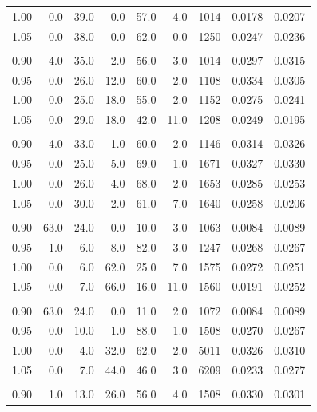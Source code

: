 \begin{table}[t]
\begin{tabular}{r r r r r r r r r}
1.00 & 0.0 & 39.0 & 0.0 & 57.0 & 4.0 & 1014 & 0.0178 & 0.0207 \\
1.05 & 0.0 & 38.0 & 0.0 & 62.0 & 0.0 & 1250 & 0.0247 & 0.0236 \\
\addlinespace[0.35em]
\multicolumn{9}{l}{$N=8$, $\mathrm{ppn}=4$, $t=1\,\mathrm{s}$} \\
\midrule
0.90 & 4.0 & 35.0 & 2.0 & 56.0 & 3.0 & 1014 & 0.0297 & 0.0315 \\
0.95 & 0.0 & 26.0 & 12.0 & 60.0 & 2.0 & 1108 & 0.0334 & 0.0305 \\
1.00 & 0.0 & 25.0 & 18.0 & 55.0 & 2.0 & 1152 & 0.0275 & 0.0241 \\
1.05 & 0.0 & 29.0 & 18.0 & 42.0 & 11.0 & 1208 & 0.0249 & 0.0195 \\
\addlinespace[0.35em]
\multicolumn{9}{l}{$N=8$, $\mathrm{ppn}=4$, $t=10\,\mathrm{s}$} \\
\midrule
0.90 & 4.0 & 33.0 & 1.0 & 60.0 & 2.0 & 1146 & 0.0314 & 0.0326 \\
0.95 & 0.0 & 25.0 & 5.0 & 69.0 & 1.0 & 1671 & 0.0327 & 0.0330 \\
1.00 & 0.0 & 26.0 & 4.0 & 68.0 & 2.0 & 1653 & 0.0285 & 0.0253 \\
1.05 & 0.0 & 30.0 & 2.0 & 61.0 & 7.0 & 1640 & 0.0258 & 0.0206 \\
\addlinespace[0.35em]
\multicolumn{9}{l}{$N=8$, $\mathrm{ppn}=8$, $t=1\,\mathrm{s}$} \\
\midrule
0.90 & 63.0 & 24.0 & 0.0 & 10.0 & 3.0 & 1063 & 0.0084 & 0.0089 \\
0.95 & 1.0 & 6.0 & 8.0 & 82.0 & 3.0 & 1247 & 0.0268 & 0.0267 \\
1.00 & 0.0 & 6.0 & 62.0 & 25.0 & 7.0 & 1575 & 0.0272 & 0.0251 \\
1.05 & 0.0 & 7.0 & 66.0 & 16.0 & 11.0 & 1560 & 0.0191 & 0.0252 \\
\addlinespace[0.35em]
\multicolumn{9}{l}{$N=8$, $\mathrm{ppn}=8$, $t=10\,\mathrm{s}$} \\
\midrule
0.90 & 63.0 & 24.0 & 0.0 & 11.0 & 2.0 & 1072 & 0.0084 & 0.0089 \\
0.95 & 0.0 & 10.0 & 1.0 & 88.0 & 1.0 & 1508 & 0.0270 & 0.0267 \\
1.00 & 0.0 & 4.0 & 32.0 & 62.0 & 2.0 & 5011 & 0.0326 & 0.0310 \\
1.05 & 0.0 & 7.0 & 44.0 & 46.0 & 3.0 & 6209 & 0.0233 & 0.0277 \\
\addlinespace[0.35em]
\multicolumn{9}{l}{$N=16$, $\mathrm{ppn}=4$, $t=1\,\mathrm{s}$} \\
\midrule
0.90 & 1.0 & 13.0 & 26.0 & 56.0 & 4.0 & 1508 & 0.0330 & 0.0301 \\

\end{tabular}
\end{table}
